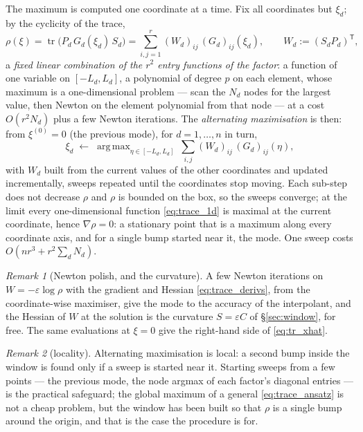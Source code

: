 \documentclass[11pt,a4paper]{article}
\newcommand{\tr}{\operatorname{tr}}
\newcommand{\argmax}{\operatorname{arg\,max}}
\newcommand{\T}{^{\mathsf T}}
\newcommand{\eps}{\varepsilon}
\newcommand{\grad}{\nabla}
\theoremstyle{plain}
\theoremstyle{definition}
\theoremstyle{remark}
\newtheorem{remark}{Remark}
\begin{document}
The maximum is computed one coordinate at a time. Fix all coordinates but $\xi_d$; by the cyclicity of the trace,
\begin{equation}
  \rho(\xi) = \tr\big(P_d\,G_d(\xi_d)\,S_d\big) = \sum_{i,j=1}^r(W_d)_{ij}\,(G_d)_{ij}(\xi_d),
  \qquad W_d := (S_dP_d)\T ,
  \label{eq:trace_1d}
\end{equation}
a \emph{fixed linear combination of the $r^2$ entry functions of the factor}: a function of one variable on $[-L_d,L_d]$, a polynomial of degree $p$ on each element, whose maximum is a one-dimensional problem --- scan the $N_d$ nodes for the largest value, then Newton on the element polynomial from that node --- at a cost $O(r^2N_d)$ plus a few Newton iterations. The \emph{alternating maximisation} is then: from $\xi^{(0)}=0$ (the previous mode), for $d=1,\dots,n$ in turn,
\begin{equation}
  \xi_d \;\leftarrow\; \argmax_{\eta\in[-L_d,L_d]}\ \sum_{i,j}(W_d)_{ij}\,(G_d)_{ij}(\eta),
  \label{eq:trace_sweep}
\end{equation}
with $W_d$ built from the current values of the other coordinates and updated incrementally, sweeps repeated until the coordinates stop moving. Each sub-step does not decrease $\rho$ and $\rho$ is bounded on the box, so the sweeps converge; at the limit every one-dimensional function \eqref{eq:trace_1d} is maximal at the current coordinate, hence $\grad\rho=0$: a stationary point that is a maximum along every coordinate axis, and for a single bump started near it, the mode. One sweep costs $O(nr^3+r^2\sum_dN_d)$.

\begin{remark}[Newton polish, and the curvature]
A few Newton iterations on $W=-\eps\log\rho$ with the gradient and Hessian \eqref{eq:trace_derivs}, from the coordinate-wise maximiser, give the mode to the accuracy of the interpolant, and the Hessian of $W$ at the solution is the curvature $S=\eps C$ of \S\ref{sec:window}, for free. The same evaluations at $\xi=0$ give the right-hand side of \eqref{eq:tr_xhat}.
\end{remark}

\begin{remark}[locality]
Alternating maximisation is local: a second bump inside the window is found only if a sweep is started near it. Starting sweeps from a few points --- the previous mode, the node argmax of each factor's diagonal entries --- is the practical safeguard; the global maximum of a general \eqref{eq:trace_ansatz} is not a cheap problem, but the window has been built so that $\rho$ is a single bump around the origin, and that is the case the procedure is for.
\end{remark}
\end{document}
